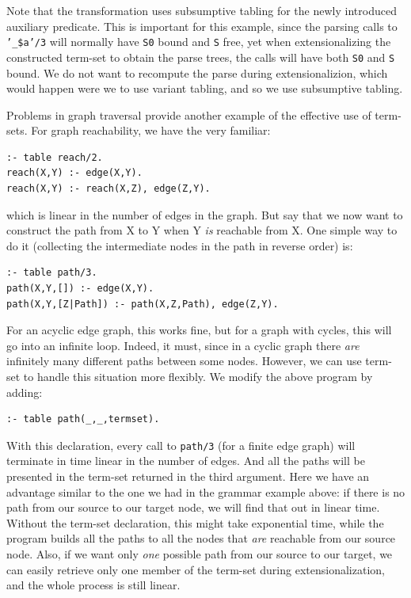Note that the transformation uses subsumptive tabling for the newly
introduced auxiliary predicate.  This is important for this example,
since the parsing calls to {\tt '\_\$a'/3} will normally have {\tt S0}
bound and {\tt S} free, yet when extensionalizing the constructed
term-set to obtain the parse trees, the calls will have both {\tt S0}
and {\tt S} bound.  We do not want to recompute the parse during
extensionalizion, which would happen were we to use variant
tabling, and so we use subsumptive tabling.

Problems in graph traversal provide another example of the effective
use of term-sets.  For graph reachability, we have the very familiar:
\begin{verbatim}
:- table reach/2.
reach(X,Y) :- edge(X,Y).
reach(X,Y) :- reach(X,Z), edge(Z,Y).
\end{verbatim}
which is linear in the number of edges in the graph.  But say that we
now want to construct the path from X to Y when Y \emph{is} reachable
from X.  One simple way to do it (collecting the intermediate nodes in
the path in reverse order) is:
\begin{verbatim}
:- table path/3.
path(X,Y,[]) :- edge(X,Y).
path(X,Y,[Z|Path]) :- path(X,Z,Path), edge(Z,Y).
\end{verbatim}
For an acyclic edge graph, this works fine, but for a graph with
cycles, this will go into an infinite loop.  Indeed, it must, since in
a cyclic graph there \emph{are} infinitely many different paths between
some nodes.  However, we can use term-set to handle this situation
more flexibly.  We modify the above program by adding:
\begin{verbatim}
:- table path(_,_,termset).
\end{verbatim}
With this declaration, every call to {\tt path/3} (for a finite edge
graph) will terminate in time linear in the number of edges.  And all
the paths will be presented in the term-set returned in the third
argument.  Here we have an advantage similar to the one we had in the
grammar example above: if there is no path from our source to our
target node, we will find that out in linear time.  Without the
term-set declaration, this might take exponential time, while the
program builds all the paths to all the nodes that \emph{are} reachable
from our source node.  Also, if we want only \emph{one} possible path
from our source to our target, we can easily retrieve only one member
of the term-set during extensionalization, and the whole process is
still linear.

